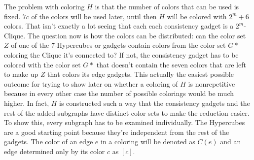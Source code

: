 \documentclass[12pt,a4paper]{article}
\begin{document}
The problem with coloring $H$ is that the number of colors that can be used is fixed. $7c$ of the colors will be used later, until then $H$ will be colored with $2^m+6$ colors. That isn't exactly a lot seeing that each each consistency gadget is a $2^m$-Clique. The question now is how the colors can be distributed: can the color set $Z$ of one of the 7-Hypercubes or gadgets contain colors from the color set $G*$ coloring the Clique it's connected to? If not, the consistency gadget has to be colored with the color set $G*$ that doesn't contain the seven colors that are left to make up $Z$ that colors its edge gadgets. This actually the easiest possible outcome for trying to show later on whether a coloring of $H$ is nonrepetitive because in every other case the number of possible colorings would be much higher. In fact, $H$ is constructed such a way that the consistency gadgets and the rest of the added subgraphs have distinct color sets to make the reduction easier. To show this, every subgraph has to be examined individually. The Hypercubes are a good starting point because they're independent from the rest of the gadgets. The color of an edge $e$ in a coloring will be denoted as $C(e)$ and an edge determined only by its color $c$ as $[c]$. 
\newline
\end{document}
